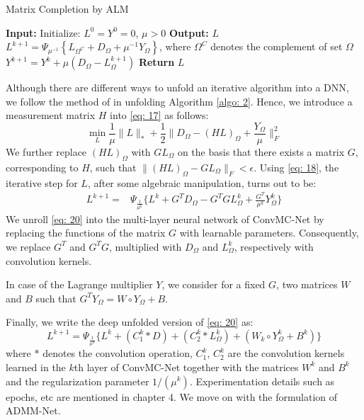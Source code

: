\begin{algorithm}
\caption{Matrix Completion by ALM}
\begin{algorithmic}[1]
\State \textbf{Input:} Initialize: $L^0 = Y^0 = 0$, $\mu > 0$
\State \textbf{Output:} $L$
    \State $L^{k+1} = \Psi_{\mu^{-1}} \left\{ L_{\Omega^C} + D_{\Omega} + \mu^{-1}Y_{\Omega} \right\}$, where $\Omega^C$ denotes the complement of set $\Omega$
    \State $Y^{k+1} = Y^k + \mu(D_{\Omega} - L^{k+1}_{\Omega})$
\EndWhile
\State \textbf{Return} $L$
\end{algorithmic}
\label{algo: 2}
\end{algorithm}

Although there are different ways \cite{way1, way2, way3} to unfold an iterative algorithm into a DNN, we follow the method of \cite{way1} in unfolding Algorithm \ref{algo: 2}. Hence, we introduce a measurement matrix $H$ into \eqref{eq: 17} as follows:
\begin{equation}
\min_L \frac{1}{\mu} \|L\|_* + \frac{1}{2} \|D_{\Omega} - (HL)_{\Omega} + \frac{Y_{\Omega}}{\mu}\|_F^2 \label{eq: 19}
\end{equation}
We further replace $(HL)_{\Omega}$ with $GL_{\Omega}$ on the basis that there exists a matrix $G$, corresponding to $H$, such that $\|(HL)_{\Omega} - GL_{\Omega}\|_F < \epsilon$. Using \ref{eq: 18}, the iterative step for $L$, after some algebraic manipulation, turns out to be:
\begin{equation}
\begin{aligned}
L^{k+1} = &\Psi_{\frac{1}{\mu^k}} \{L^{k} + G^T D_{\Omega} - G^T G L^{k}_{\Omega} + \frac{G^T}{\mu^{k}} Y^{k}_{\Omega} \}
\end{aligned}
\label{eq: 20}
\end{equation}
We unroll \ref{eq: 20} into the multi-layer neural network of ConvMC-Net by replacing the functions of the matrix $G$ with learnable parameters. Consequently, we replace $G^T$ and $G^T G$, multiplied with $D_{\Omega}$ and $L^{k}_{\Omega}$, respectively with convolution kernels.

In case of the Lagrange multiplier $Y$, we consider for a fixed $G$, two matrices $W$ and $B$ such that $G^T Y_{\Omega} = W \circ Y_{\Omega} + B$.

Finally, we write the deep unfolded version of \ref{eq: 20} as:
\begin{equation}
L^{k+1} = \Psi_{\frac{1}{\mu^{k}}} \{L^{k} + (C^{k}_{1} * D) + (C^{k}_{2} * L^{k}_{\Omega}) + (W_k \circ Y^{k}_{\Omega} + B^k)\}
\label{eq: 21}
\end{equation}
where $*$ denotes the convolution operation, $C^{k}_{1}$, $C^{k}_{2}$ are the convolution kernels learned in the $k$th layer of ConvMC-Net together with the matrices $W^k$ and $B^k$ and the regularization parameter $1/(\mu^k)$. Experimentation details such as epochs, etc are mentioned in chapter 4. We move on with the formulation of ADMM-Net. 


